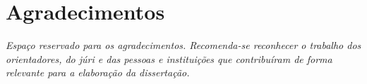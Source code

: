 \chapter*{Agradecimentos}

\textit{Espaço reservado para os agradecimentos. Recomenda-se reconhecer
o trabalho dos orientadores, do júri e das pessoas e instituições que
contribuíram de forma relevante para a elaboração da dissertação.}
